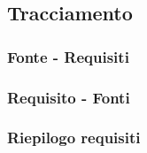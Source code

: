 \subsection{Tracciamento}

\subsubsection{Fonte - Requisiti} \label{FonteReq}


\subsubsection{Requisito - Fonti} \label{ReqFonte}


\newpage
\subsubsection{Riepilogo requisiti} \label{Riepilogo}


